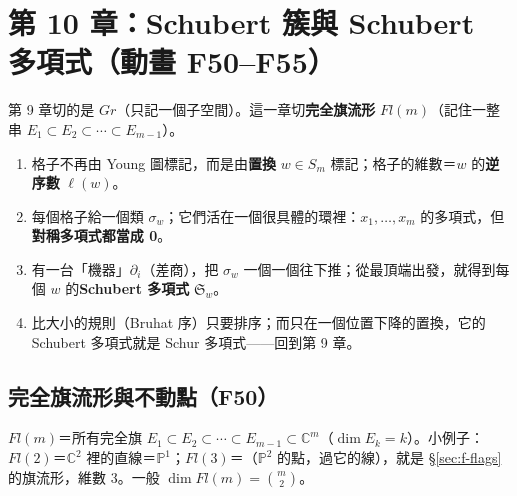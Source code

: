 
\section{第 10 章：Schubert 簇與 Schubert 多項式（動畫 F50--F55）}\label{sec:f-ch10}

\begin{keybox}
第 9 章切的是 $Gr$（只記一個子空間）。這一章切\textbf{完全旗流形} $Fl(m)$（記住一整串 $E_1\subset E_2\subset\cdots\subset E_{m-1}$）。
\begin{enumerate}[nosep]
\item 格子不再由 Young 圖標記，而是由\textbf{置換} $w\in S_m$ 標記；格子的維數＝$w$ 的\textbf{逆序數} $\ell(w)$。
\item 每個格子給一個類 $\sigma_w$；它們活在一個很具體的環裡：$x_1,\dots,x_m$ 的多項式，但\textbf{對稱多項式都當成 0}。
\item 有一台「機器」$\partial_i$（差商），把 $\sigma_w$ 一個一個往下推；從最頂端出發，就得到每個 $w$ 的\textbf{Schubert 多項式} $\mathfrak S_w$。
\item 比大小的規則（Bruhat 序）只要排序；而只在一個位置下降的置換，它的 Schubert 多項式就是 Schur 多項式——回到第 9 章。
\end{enumerate}
\end{keybox}

\subsection{完全旗流形與不動點（F50）}\label{sec:f-fixed}

$Fl(m)$＝所有完全旗 $E_1\subset E_2\subset\cdots\subset E_{m-1}\subset\mathbb C^m$（$\dim E_k=k$）。小例子：
$Fl(2)$＝$\mathbb C^2$ 裡的直線＝$\mathbb P^1$；$Fl(3)$＝（$\mathbb P^2$ 的點，過它的線），就是 \S\ref{sec:f-flags} 的旗流形，維數 3。一般 $\dim Fl(m)=\binom m2$。

